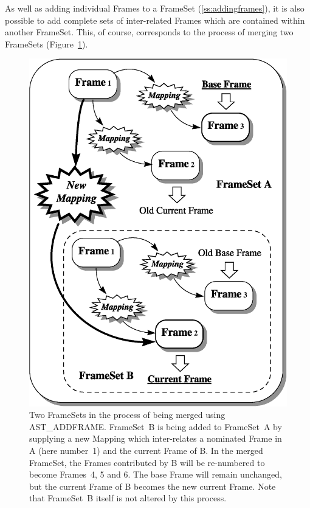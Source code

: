 \documentclass[twoside,11pt]{article}
\newenvironment{latexonly}{}{}
\newcommand{\htmlref}[2]{#1}
\newcommand{\secref}[1]{\S\ref{#1}}
\renewcommand{\secref}[1]{\ref{#1}}
\begin{document}
\begin{latexonly}
   As well as adding individual Frames to a \htmlref{FrameSet}{FrameSet}
   (\secref{ss:addingframes}), it is also possible to add complete sets of
   inter-related Frames which are contained within another
   FrameSet. This, of course, corresponds to the process of merging two
   FrameSets (Figure~\ref{fig:fsmerge}).
   \begin{figure}[hbtp]
   \begin{center}
   \includegraphics[scale=0.6]{sun210_figures/fsmerge.eps}
   \caption{Two FrameSets in the process of being merged using
   \htmlref{AST\_ADDFRAME}{AST_ADDFRAME}. FrameSet~B is being added to FrameSet~A by supplying a
   new \htmlref{Mapping}{Mapping} which inter-relates a nominated \htmlref{Frame}{Frame} in A (here number~1)
   and the current Frame of B. In the merged FrameSet, the Frames
   contributed by B will be re-numbered to become Frames~4, 5 and 6. The
   base Frame will remain unchanged, but the current Frame of B becomes
   the new current Frame. Note that FrameSet~B itself is not
   altered by this process.}
   \label{fig:fsmerge}
   \end{center}
   \end{figure}
\end{latexonly}
\end{document}
